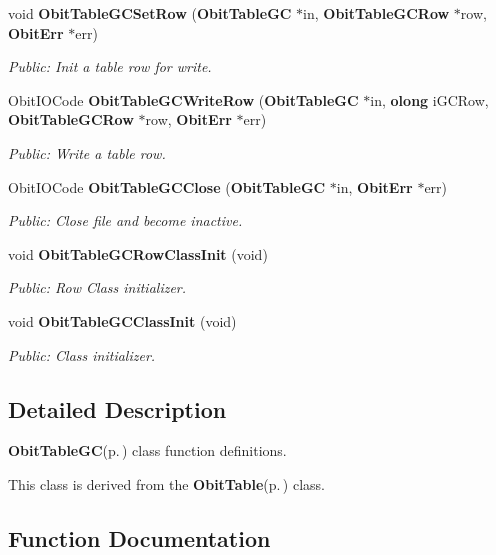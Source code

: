 \begin{CompactItemize}
void {\bf Obit\-Table\-GCSet\-Row} ({\bf Obit\-Table\-GC} $\ast$in, {\bf Obit\-Table\-GCRow} $\ast$row, {\bf Obit\-Err} $\ast$err)
\begin{CompactList}\small\item\em Public: Init a table row for write. \item\end{CompactList}\item 
Obit\-IOCode {\bf Obit\-Table\-GCWrite\-Row} ({\bf Obit\-Table\-GC} $\ast$in, {\bf olong} i\-GCRow, {\bf Obit\-Table\-GCRow} $\ast$row, {\bf Obit\-Err} $\ast$err)
\begin{CompactList}\small\item\em Public: Write a table row. \item\end{CompactList}\item 
Obit\-IOCode {\bf Obit\-Table\-GCClose} ({\bf Obit\-Table\-GC} $\ast$in, {\bf Obit\-Err} $\ast$err)
\begin{CompactList}\small\item\em Public: Close file and become inactive. \item\end{CompactList}\item 
void {\bf Obit\-Table\-GCRow\-Class\-Init} (void)
\begin{CompactList}\small\item\em Public: Row Class initializer. \item\end{CompactList}\item 
void {\bf Obit\-Table\-GCClass\-Init} (void)
\begin{CompactList}\small\item\em Public: Class initializer. \item\end{CompactList}\end{CompactItemize}


\subsection{Detailed Description}
{\bf Obit\-Table\-GC}{\rm (p.\,\pageref{structObitTableGC})} class function definitions. 

This class is derived from the {\bf Obit\-Table}{\rm (p.\,\pageref{structObitTable})} class.

\subsection{Function Documentation}
